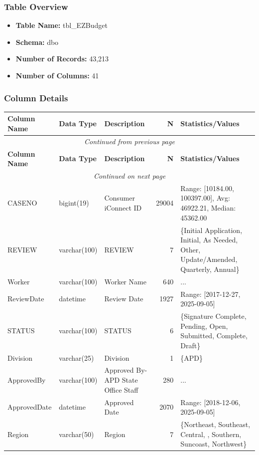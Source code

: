 \begin{landscape}
\subsubsection{Table Overview}
\begin{itemize}
\item \textbf{Table Name:} tbl\_EZBudget
\item \textbf{Schema:} dbo
\item \textbf{Number of Records:} 43,213
\item \textbf{Number of Columns:} 41
\end{itemize}

\subsubsection{Column Details}
\begin{longtable}{|l|l|l|r|p{6cm}|}
\hline
\textbf{Column Name} & \textbf{Data Type} & \textbf{Description} & \textbf{N} & \textbf{Statistics/Values} \\
\hline
\endfirsthead
\multicolumn{5}{c}{\textit{Continued from previous page}} \\
\hline
\textbf{Column Name} & \textbf{Data Type} & \textbf{Description} & \textbf{N} & \textbf{Statistics/Values} \\
\hline
\endhead
\hline
\multicolumn{5}{c}{\textit{Continued on next page}} \\
\endfoot
\hline
\endlastfoot
CASENO & bigint(19) & Consumer iConnect ID & 29004 & Range: [10184.00, 100397.00], Avg: 46922.21, Median: 45362.00 \\
\hline
REVIEW & varchar(100) & REVIEW & 7 & \{Initial Application, Initial, As Needed, Other, Update/Amended, Quarterly, Annual\} \\
\hline
Worker & varchar(100) & Worker Name & 640 & ... \\
\hline
ReviewDate & datetime & Review Date & 1927 & Range: [2017-12-27, 2025-09-05] \\
\hline
STATUS & varchar(100) & STATUS & 6 & \{Signature Complete, Pending, Open, Submitted, Complete, Draft\} \\
\hline
Division & varchar(25) & Division & 1 & \{APD\} \\
\hline
ApprovedBy & varchar(100) & Approved By- APD State Office Staff & 280 & ... \\
\hline
ApprovedDate & datetime & Approved Date & 2070 & Range: [2018-12-06, 2025-09-05] \\
\hline
Region & varchar(50) & Region & 7 & \{Northeast, Southeast, Central, , Southern, Suncoast, Northwest\} \\

\end{longtable}
\end{landscape}
